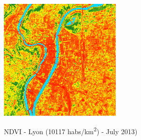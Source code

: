 \documentclass[c]{beamer}
\begin{document}
\begin{frame}
\begin{columns}
\begin{column}{0.25\textwidth}
  \begin{overlayarea}{\linewidth}{1.6cm}
  \centering\vfill
  \includegraphics[scale=0.17]{images/Lyon/07_ndvi.png}
  \end{overlayarea}
  \begin{overlayarea}{\linewidth}{0.5cm}
  \centering
  \tiny NDVI - Lyon (10117 habs/km\textsuperscript{2}) - July 2013) \par
  \end{overlayarea}  
 \end{column}

\end{columns}


\end{frame}
\end{document}
